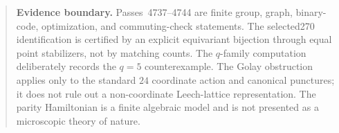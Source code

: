 \begin{quote}\small
\textbf{Evidence boundary.}
Passes~4737--4744 are finite group, graph, binary-code, optimization, and
commuting-check statements.  The selected270 identification is certified by an
explicit equivariant bijection through equal point stabilizers, not by matching
counts.  The $q$-family computation deliberately records the $q=5$ counterexample.
The Golay obstruction applies only to the standard $24$ coordinate action and
canonical punctures; it does not rule out a non-coordinate Leech-lattice
representation.  The parity Hamiltonian is a finite algebraic model and is not
presented as a microscopic theory of nature.
\end{quote}

